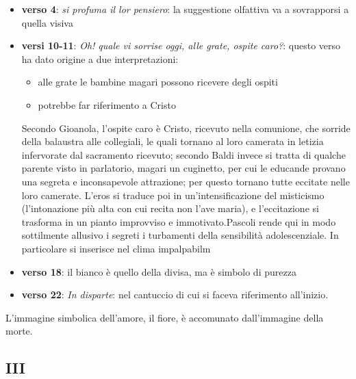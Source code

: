 \documentclass[a4paper, twoside, titlepage]{book}
\newcounter{mar}
\newcommand{\elenco}[1]{%
\begin{itemize}
#1
\end{itemize}}
\begin{document}
\elenco{\item \textbf{verso 4}: \textit{si profuma il lor pensiero}: la suggestione olfattiva va a sovrapporsi a quella visiva
\item \textbf{versi 10-11}: \textit{Oh! quale vi sorrise oggi, alle grate, ospite caro?}: questo verso ha dato origine a due interpretazioni:
  \elenco{\item alle grate le bambine magari possono ricevere degli ospiti
  \item potrebbe far riferimento a Cristo}
  Secondo Gioanola, l'ospite caro è Cristo, ricevuto nella comunione, che sorride della balaustra alle collegiali, le quali tornano al loro camerata in letizia infervorate dal sacramento ricevuto; secondo Baldi invece si tratta di qualche parente visto in parlatorio, magari un cuginetto, per cui le educande provano una segreta e inconsapevole attrazione; per questo tornano tutte eccitate nelle loro camerate. L'eros si traduce poi in un'intensificazione del misticismo (l'intonazione più alta con cui recita non l'ave maria), e l'eccitazione si trasforma in un pianto improvviso e immotivato.Pascoli rende qui in modo sottilmente allusivo i segreti i turbamenti della sensibilità adolescenziale. In particolare si inserisce nel clima impalpabilm
\item \textbf{verso 18}: il bianco è quello della divisa, ma è simbolo di purezza
\item \textbf{verso 22}: \textit{In disparte}: nel cantuccio di cui si faceva riferimento all'inizio.}

L'immagine simbolica dell'amore, il fiore, è accomunato dall'immagine della morte.

\subsection*{III}
\end{document}
